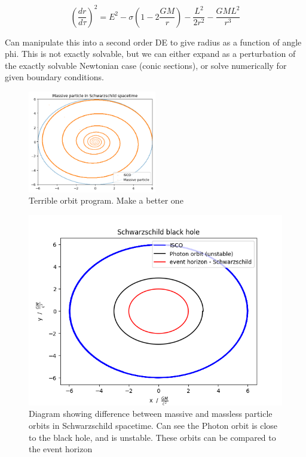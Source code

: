 \documentclass{article}
\begin{document}
\begin{equation}
    \left (\frac{dr}{d\tau} \right )^2 = E^2 - \sigma \left( 1 - 2 \frac{G M}{r} \right) - \frac{L^2}{2 r^2} - \frac{G M L^2}{r^3}
\end{equation}

Can manipulate this into a second order DE to give radius as a function of angle phi. This is not exactly solvable, but we can either expand as a perturbation of the exactly solvable Newtonian case (conic sections), or solve numerically for given boundary conditions.

\begin{figure}
    \centering
    \includegraphics[width=0.5\textwidth]{images/shitty_orbit_program.png}
    \caption{Terrible orbit program. Make a better one}
    \label{fig:terrible orbit program}
\end{figure}


\begin{figure}
    \centering
    \includegraphics[width=0.66
\textwidth]{images/schwarzschild_orbits.png}
    \caption{Diagram showing difference between massive and massless particle orbits in Schwarzschild spacetime. Can see the Photon orbit is close to the black hole, and is unstable. These orbits can be compared to the event horizon}
    \label{fig:Scwarzschild orbits}
\end{figure}
\end{document}
